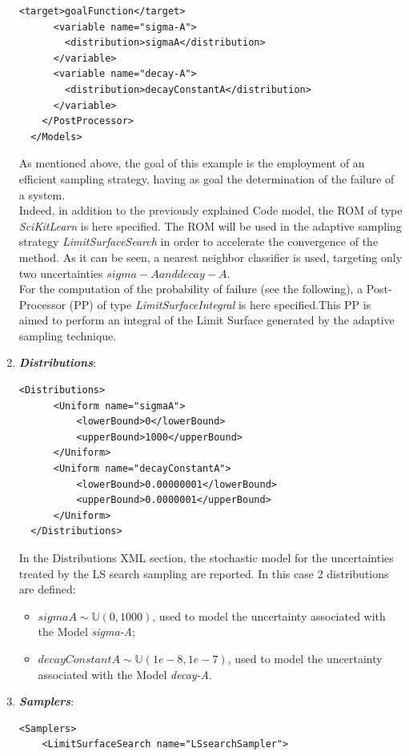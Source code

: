 \begin{enumerate}
\begin{lstlisting}[style=XML,morekeywords={arg,extension,pauseAtEnd,overwrite}]
      <target>goalFunction</target>
      <variable name="sigma-A">
        <distribution>sigmaA</distribution>
      </variable>
      <variable name="decay-A">
        <distribution>decayConstantA</distribution>
      </variable>
    </PostProcessor>
  </Models>
\end{lstlisting}
 As mentioned above, the goal of this example is the employment of 
 an efficient sampling strategy, having as goal the determination of the
 failure of a system.
 \\Indeed, in addition to the previously explained Code 
 model,
 the ROM of type \textit{SciKitLearn} is here specified. The ROM will be
 used in the adaptive sampling strategy \textit{LimitSurfaceSearch} in
 order to accelerate the convergence of the method. As it can be seen,
 a nearest neighbor classifier is used, targeting only two uncertainties 
 $sigma-A and decay-A$.
 \\ For the computation of the probability of failure (see the following), a 
 Post-Processor (PP) of type \textit{LimitSurfaceIntegral} is here 
 specified.This PP is aimed to perform an integral of the Limit Surface 
 generated by the adaptive sampling technique. 
   \item \textbf{\textit{Distributions}}:
\begin{lstlisting}[style=XML]
  <Distributions>
      <Uniform name="sigmaA">
          <lowerBound>0</lowerBound>
          <upperBound>1000</upperBound>
      </Uniform>
      <Uniform name="decayConstantA">
          <lowerBound>0.00000001</lowerBound>
          <upperBound>0.0000001</upperBound>
      </Uniform>
  </Distributions>
\end{lstlisting}
  In the Distributions XML section, the stochastic model for the 
  uncertainties  treated by the LS search sampling are reported. In 
  this case 2 distributions are defined: 
  \begin{itemize}
    \item $sigmaA \sim \mathbb{U}(0,1000)$, used to model the uncertainty 
    associated with  the Model \textit{sigma-A};
    \item  $decayConstantA \sim \mathbb{U}(1e-8,1e-7)$,  used to 
    model the uncertainty 
    associated with  the Model \textit{decay-A}.
  \end{itemize}
   \item \textbf{\textit{Samplers}}:
\begin{lstlisting}[style=XML,morekeywords={arg,extension,pauseAtEnd,overwrite}]
  <Samplers>
    <LimitSurfaceSearch name="LSsearchSampler">

\end{lstlisting}
\end{enumerate}
